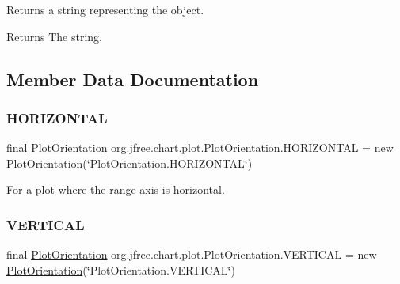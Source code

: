 Returns a string representing the object.

\begin{DoxyReturn}{Returns}
The string. 
\end{DoxyReturn}


\subsection{Member Data Documentation}
\mbox{\label{classorg_1_1jfree_1_1chart_1_1plot_1_1_plot_orientation_a79919b3737e371f37b1267b11fd7c4e1}} 
\subsubsection{\texorpdfstring{H\+O\+R\+I\+Z\+O\+N\+T\+AL}{HORIZONTAL}}
{\footnotesize\ttfamily final \mbox{\hyperlink{classorg_1_1jfree_1_1chart_1_1plot_1_1_plot_orientation}{Plot\+Orientation}} org.\+jfree.\+chart.\+plot.\+Plot\+Orientation.\+H\+O\+R\+I\+Z\+O\+N\+T\+AL = new \mbox{\hyperlink{classorg_1_1jfree_1_1chart_1_1plot_1_1_plot_orientation}{Plot\+Orientation}}(\char`\"{}Plot\+Orientation.\+H\+O\+R\+I\+Z\+O\+N\+T\+AL\char`\"{})\hspace{0.3cm}{\ttfamily [static]}}

For a plot where the range axis is horizontal. \mbox{\label{classorg_1_1jfree_1_1chart_1_1plot_1_1_plot_orientation_a2b064227b679130eb0b5e3ac022e5371}} 
\subsubsection{\texorpdfstring{V\+E\+R\+T\+I\+C\+AL}{VERTICAL}}
{\footnotesize\ttfamily final \mbox{\hyperlink{classorg_1_1jfree_1_1chart_1_1plot_1_1_plot_orientation}{Plot\+Orientation}} org.\+jfree.\+chart.\+plot.\+Plot\+Orientation.\+V\+E\+R\+T\+I\+C\+AL = new \mbox{\hyperlink{classorg_1_1jfree_1_1chart_1_1plot_1_1_plot_orientation}{Plot\+Orientation}}(\char`\"{}Plot\+Orientation.\+V\+E\+R\+T\+I\+C\+AL\char`\"{})\hspace{0.3cm}{\ttfamily [static]}}

